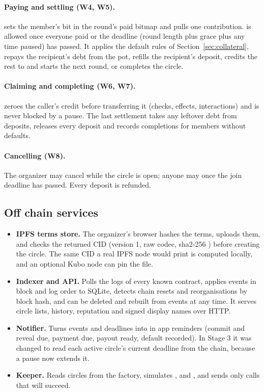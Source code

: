 \paragraph{Paying and settling (W4, W5).}  sets the member's bit in the round's paid
bitmap and pulls one contribution.  is allowed once everyone paid or the deadline
(round length plus grace plus any time paused) has passed. It applies the default rules of
Section~\ref{sec:collateral}, repays the recipient's debt from the pot, refills the recipient's
deposit, credits the rest to  and starts the next round, or completes the circle.

\paragraph{Claiming and completing (W6, W7).}  zeroes the caller's credit before
transferring it (checks, effects, interactions) and is never blocked by a pause. The last settlement
takes any leftover debt from deposits, releases every deposit and records completions for members
without defaults.

\paragraph{Cancelling (W8).} The organizer may cancel while the circle is open; anyone may once the
join deadline has passed. Every deposit is refunded.

\subsection{Off chain services}
\begin{itemize}
  \item \textbf{IPFS terms store.} The organizer's browser hashes the terms, uploads them, and checks
        the returned CID (version 1, raw codec, sha2-256 \cite{multiformats}) before creating the
        circle. The same CID a real IPFS node would print is computed locally, and an optional Kubo
        node can pin the file.
  \item \textbf{Indexer and API.} Polls the logs of every known contract, applies events in block and
        log order to SQLite, detects chain resets and reorganisations by block hash, and can be deleted
        and rebuilt from events at any time. It serves circle lists, history, reputation and signed
        display names over HTTP.
  \item \textbf{Notifier.} Turns events and deadlines into in app reminders (commit and reveal due,
        payment due, payout ready, default recorded). In Stage 3 it was changed to read each active
        circle's current deadline from the chain, because a pause now extends it.
  \item \textbf{Keeper.} Reads circles from the factory, simulates ,
         and , and sends only calls that will succeed.
\end{itemize}

